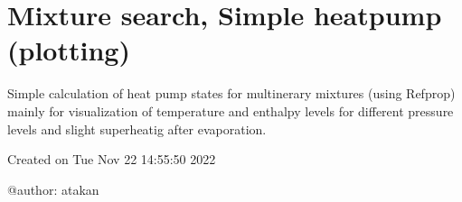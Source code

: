 \documentclass[letterpaper,10pt,english]{sphinxmanual}
\begin{document}
\sphinxstepscope


\chapter{Mixture search, Simple heat\sphinxhyphen{}pump (plotting)}
\label{\detokenize{mixture_search:module-mixture_search}}\label{\detokenize{mixture_search:mixture-search-simple-heat-pump-plotting}}\label{\detokenize{mixture_search::doc}}
\sphinxAtStartPar
Simple calculation of heat pump states for multinerary mixtures (using Refprop)
mainly for visualization of temperature and enthalpy levels for different
pressure levels and slight superheatig after evaporation.

\sphinxAtStartPar
Created on Tue Nov 22 14:55:50 2022

\sphinxAtStartPar
@author: atakan
\end{document}
